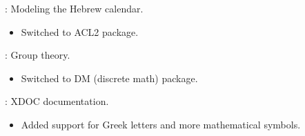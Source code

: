 
\begin{frame}

\implibtitle

:
Modeling the Hebrew calendar.
\begin{itemize}
\item Switched to ACL2 package.
\end{itemize}

:
Group theory.
\begin{itemize}
\item Switched to DM (discrete math) package.
\end{itemize}

\end{frame}


\begin{frame}

\implibtitle

:
XDOC documentation.
\begin{itemize}
\item Added support for Greek letters and more mathematical symbols.
\end{itemize}

\end{frame}



